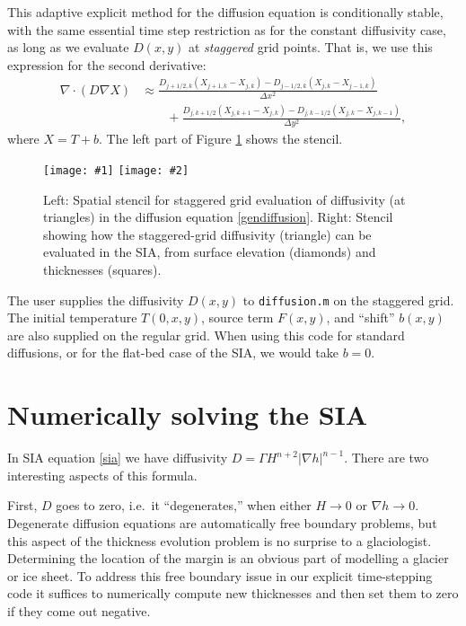 \documentclass[letterpaper,final,12pt,reqno]{amsart}
\newcommand{\grad}{\nabla}
\newcommand{\Div}{\nabla\cdot}
\newcommand{\minput}[1]{
\vspace{0.8cm}
\VerbatimInput[frame=single,framesep=3mm,label=\fbox{\normalsize \textsl{\,#1.m\,}},fontfamily=courier,fontsize=\footnotesize]{../mfiles/#1.slim.m}
\vspace{0.5cm}
}
\newcommand{\twofigsizes}[5]{
\begin{figure}[ht]
\centering
\texttt{[image: \#1]} \quad
\texttt{[image: \#2]}
\caption{#3}
\label{fig:#1}
\end{figure}}
\begin{document}
\minput{diffusion}

This adaptive explicit method for the diffusion equation is conditionally stable, with the same essential time step restriction as for the constant diffusivity case, as long as we evaluate $D(x,y)$ at \emph{staggered} grid points.  That is, we use this expression for the second derivative:
\begin{align*}
\Div \left(D \grad X\right) &\approx \frac{D_{j+1/2,k}(X_{j+1,k} - X_{j,k}) - D_{j-1/2,k}(X_{j,k} - X_{j-1,k})}{\Delta x^2} \\
	&\qquad + \frac{D_{j,k+1/2}(X_{j,k+1} - X_{j,k}) - D_{j,k-1/2}(X_{j,k} - X_{j,k-1})}{\Delta y^2},
\end{align*}
where $X=T+b$.  The left part of Figure \ref{fig:diffstencil} shows the stencil.

\twofigsizes{diffstencil}{mahaffystencil}{Left:  Spatial stencil for staggered grid evaluation of diffusivity (at triangles) in the diffusion equation \eqref{gendiffusion}.  Right: Stencil showing how the staggered-grid diffusivity (triangle) can be evaluated in the SIA, from surface elevation (diamonds) and thicknesses (squares).}{2.2in}{2.2in}

The user supplies the diffusivity $D(x,y)$ to \texttt{diffusion.m} on the staggered grid.  The initial temperature $T(0,x,y)$, source term $F(x,y)$, and ``shift'' $b(x,y)$ are also supplied on the regular grid.  When using this code for standard diffusions, or for the flat-bed case of the SIA, we would take $b=0$.


\section{Numerically solving the SIA} \label{sec:numericalsia}

In SIA equation \eqref{sia} we have diffusivity $D = \Gamma H^{n+2} |\grad h|^{n-1}$.  There are two interesting aspects of this formula.

First, $D$ goes to zero, i.e.~it ``degenerates,'' when either $H\to 0$ or $\grad h \to 0$.  Degenerate diffusion equations are automatically free boundary problems, but this aspect of the thickness evolution problem is no surprise to a glaciologist.  Determining the location of the margin is an obvious part of modelling a glacier or ice sheet.  To address this free boundary issue in our explicit time-stepping code it suffices to numerically compute new thicknesses and then set them to zero if they come out negative.
\end{document}
